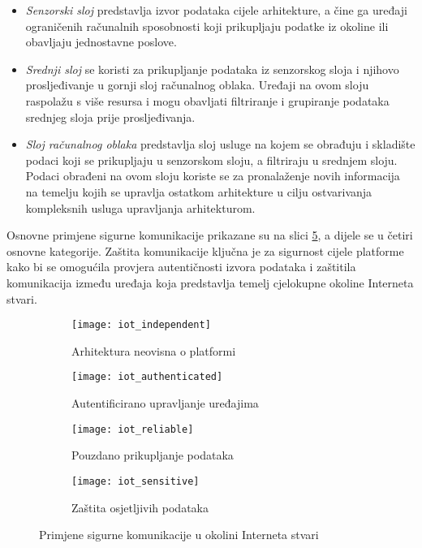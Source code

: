 \begin{itemize}
\item \textit{Senzorski sloj} predstavlja izvor podataka cijele arhitekture, a
    čine ga uređaji ograničenih računalnih sposobnosti koji prikupljaju podatke
    iz okoline ili obavljaju jednostavne poslove.
\item \textit{Srednji sloj} se koristi za prikupljanje podataka iz senzorskog
    sloja i njihovo prosljeđivanje u gornji sloj računalnog oblaka. Uređaji na
    ovom sloju raspolažu s više resursa i mogu obavljati filtriranje i
    grupiranje podataka srednjeg sloja prije prosljeđivanja.
\item \textit{Sloj računalnog oblaka} predstavlja sloj usluge na kojem se
    obrađuju i skladište podaci koji se prikupljaju u senzorskom sloju, a
    filtriraju u srednjem sloju. Podaci obrađeni na ovom sloju koriste se za
    pronalaženje novih informacija na temelju kojih se upravlja ostatkom
    arhitekture u cilju ostvarivanja kompleksnih usluga upravljanja
    arhitekturom.
\end{itemize}

Osnovne primjene sigurne komunikacije prikazane su na slici \ref{fig:iot}, a
dijele se u četiri osnovne kategorije. Zaštita komunikacije ključna je za
sigurnost cijele platforme kako bi se omogućila provjera autentičnosti
izvora podataka i zaštitila komunikacija između uređaja koja predstavlja temelj
cjelokupne okoline Interneta stvari.

\begin{figure}
    \captionsetup[subfigure]{aboveskip=4pt,belowskip=4pt}
    \centering
    \begin{subfigure}[b]{0.49\textwidth}
        \texttt{[image: iot\_independent]}
        \caption{Arhitektura neovisna o platformi}
	\label{fig:independent}
    \end{subfigure}
    \begin{subfigure}[b]{0.49\textwidth}
        \texttt{[image: iot\_authenticated]}
        \caption{Autentificirano upravljanje uređajima}
	\label{fig:management}
    \end{subfigure}
    \begin{subfigure}[b]{0.49\textwidth}
        \texttt{[image: iot\_reliable]}
        \caption{Pouzdano prikupljanje podataka}
	\label{fig:reliable}
    \end{subfigure}
    \begin{subfigure}[b]{0.49\textwidth}
        \texttt{[image: iot\_sensitive]}
        \caption{Zaštita osjetljivih podataka}
	\label{fig:sensitive}
    \end{subfigure}
    \caption{Primjene sigurne komunikacije u okolini Interneta stvari}
    \label{fig:iot}
\end{figure}

